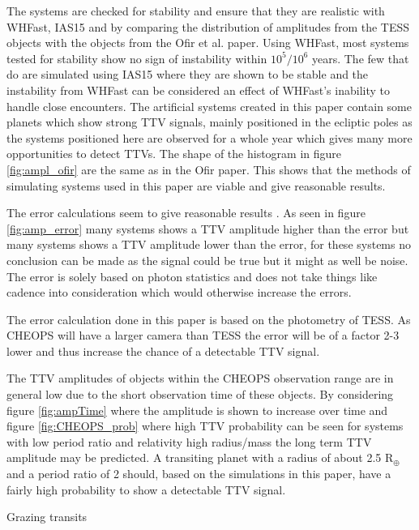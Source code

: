 \documentclass[12pt]{report}
\begin{document}
	The systems are checked for stability and ensure that they are realistic with WHFast, IAS15 and by comparing the distribution of amplitudes from the TESS objects with the objects from the Ofir et al. paper. Using WHFast, most systems tested for stability show no sign of instability within $10^5 / 10^6$ years. The few that do are simulated using IAS15 where they are shown to be stable and the instability from WHFast can be considered an effect of WHFast's inability to handle close encounters. The artificial systems created in this paper contain some planets which show strong TTV signals, mainly positioned in the ecliptic poles as the systems positioned here are observed for a whole year which gives many more opportunities to detect TTVs. The shape of the histogram in figure \ref{fig:ampl_ofir} are the same as in the Ofir paper. This shows that the methods of simulating systems used in this paper are viable and give reasonable results.
	
	The error calculations seem to give reasonable results \citep{2015ApJ...812L..18B}. As seen in figure \ref{fig:amp_error} many systems shows a TTV amplitude higher than the error but many systems shows a TTV amplitude lower than the error, for these systems no conclusion can be made as the signal could be true but it might as well be noise. The error is solely based on photon statistics and does not take things like cadence into consideration which would otherwise increase the errors. 
	
	The error calculation done in this paper is based on the photometry of TESS. As CHEOPS will have a larger camera than TESS the error will be of a factor 2-3 lower and thus increase the chance of a detectable TTV signal.
	
	The TTV amplitudes of objects within the CHEOPS observation range are in general low due to the short observation time of these objects. By considering figure \ref{fig:ampTime} where the amplitude is shown to increase over time and figure \ref{fig:CHEOPS_prob} where high TTV probability can be seen for systems with low period ratio and relativity high radius/mass the long term TTV amplitude may be predicted. A transiting planet with a radius of about 2.5 R$_{\oplus}$ and a period ratio of 2 should, based on the simulations in this paper, have a fairly high probability to show a detectable TTV signal. 
	
	Grazing transits

	
	
\end{document}
